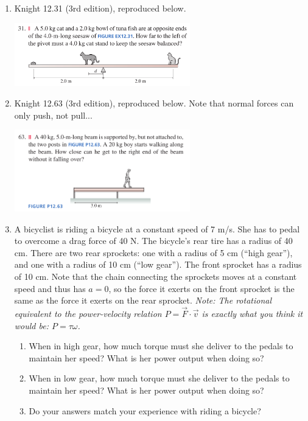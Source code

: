 \documentclass[12pt]{article}
\begin{document}
\begin{enumerate}
  \item{Knight 12.31 (3rd edition), reproduced below.}
  
    \includegraphics[width=0.6\textwidth]{cat.png}

  \item{Knight 12.63 (3rd edition), reproduced below. Note that normal forces can only push, not pull...}
  
    \includegraphics[width=0.6\textwidth]{torque2.png}

   \item{A bicyclist is riding a bicycle at a constant speed of 7 m/s. She has to pedal to overcome a drag force of 40 N. The bicycle's rear tire has a radius of 40 cm. There are two rear sprockets: one with a 
     radius of 5 cm (``high gear''), and one with a radius of 10 cm (``low gear''). The front sprocket has a radius of 10 cm. Note that the chain connecting the sprockets moves at a constant speed and thus has $a=0$, so the force it exerts on the front sprocket
   is the same as the force it exerts on the rear sprocket. {\em Note: The rotational equivalent to the power-velocity relation $P=\vec F \cdot \vec v$ is exactly what you think it would be: $P=\tau \omega$.}}

     \begin{enumerate}
       \item{When in high gear, how much torque must she deliver to the pedals to maintain her speed? What is her power output when doing so?}
       \item{When in low gear, how much torque must she deliver to the pedals to maintain her speed? What is her power output when doing so?}
       \item{Do your answers match your experience with riding a bicycle?}
     \end{enumerate}



\end{enumerate}
\end{document}
